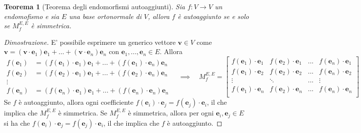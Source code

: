 \documentclass{article}
\newtheorem{theorem}{Teorema}
\begin{document}
    \begin{samepage}
    \begin{theorem}[Teorema degli endomorfismi autoaggiunti] \label{thm:self_adjoint}
        Sia $f: V \rightarrow V$ un endomofismo e sia $E$ una base ortonormale di $V$, allora $f$ è autoaggiunto se e solo se 
        $M_{f}^{E, E}$ è simmetrica.
    \end{theorem}

    \begin{proof}[Dimostrazione]
        E' possibile esprimere un generico vettore $\mathbf{v} \in V$ come $\mathbf{v} = (\mathbf{v} \cdot \mathbf{e}_{1})\mathbf{e}_{1} + ... + (\mathbf{v} \cdot \mathbf{e}_{n})\mathbf{e}_{n}$ con $\mathbf{e}_{1}, ..., \mathbf{e}_{n} \in E$. Allora
        \[
            \begin{aligned}
                f(\mathbf{e}_{1}) &= (f(\mathbf{e}_{1}) \cdot \mathbf{e}_{1})\mathbf{e}_{1} + ... + (f(\mathbf{e}_{1}) \cdot \mathbf{e}_{n})\mathbf{e}_{n} \\
                f(\mathbf{e}_{2}) &= (f(\mathbf{e}_{2}) \cdot \mathbf{e}_{1})\mathbf{e}_{1} + ... + (f(\mathbf{e}_{2}) \cdot \mathbf{e}_{n})\mathbf{e}_{n} \\
                \vdots \\
                f(\mathbf{e}_{n}) &= (f(\mathbf{e}_{n}) \cdot \mathbf{e}_{1})\mathbf{e}_{1} + ... + (f(\mathbf{e}_{n}) \cdot \mathbf{e}_{n})\mathbf{e}_{n} 
            \end{aligned}
            \quad \implies \quad 
            M_{f}^{E, E} = 
            \begin{bmatrix}
                f(\mathbf{e}_{1}) \cdot \mathbf{e}_{1} & f(\mathbf{e}_{2}) \cdot \mathbf{e}_{1} & ... & f(\mathbf{e}_{n}) \cdot \mathbf{e}_{1}   \\
                f(\mathbf{e}_{1}) \cdot \mathbf{e}_{2} & f(\mathbf{e}_{2}) \cdot \mathbf{e}_{2} & ... & f(\mathbf{e}_{n}) \cdot \mathbf{e}_{2}   \\
                \vdots & \ddots & ... & \vdots \\
                f(\mathbf{e}_{1}) \cdot \mathbf{e}_{n} & f(\mathbf{e}_{2}) \cdot \mathbf{e}_{n} & ... & f(\mathbf{e}_{n}) \cdot \mathbf{e}_{n}   \\
            \end{bmatrix}
        \]
        Se $f$ è autoaggiunto, allora ogni coefficiente $f(\mathbf{e}_{i}) \cdot \mathbf{e}_{j} = f(\mathbf{e}_{j}) \cdot \mathbf{e}_{i}$, il che implica che $M_{f}^{E, E}$ è simmetrica.
        Se $M_{f}^{E,E}$ è simmetrica, allora per ogni $\mathbf{e}_{i}, \mathbf{e}_{j} \in E$ si ha che $f(\mathbf{e}_{i}) \cdot \mathbf{e}_{j} = f(\mathbf{e}_{j}) \cdot \mathbf{e}_{i}$, il che implica che $f$ è autoaggiunto.
    \end{proof}
    \end{samepage}
\end{document}
